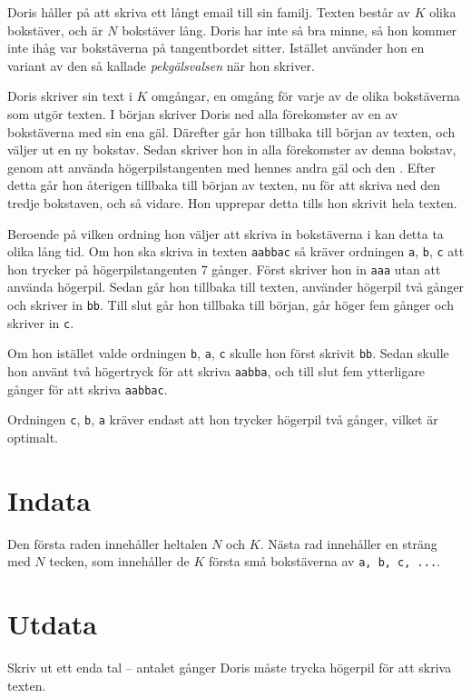 Doris håller på att skriva ett långt email till sin familj.
Texten består av $K$ olika bokstäver, och är $N$ bokstäver lång.
Doris har inte så bra minne, så hon kommer inte ihåg var bokstäverna på tangentbordet sitter.
Istället använder hon en variant av den så kallade \emph{pekgälsvalsen} när hon skriver.

Doris skriver sin text i $K$ omgångar, en omgång för varje av de olika bokstäverna som utgör texten.
I början skriver Doris ned alla förekomster av en av bokstäverna med sin ena gäl.
Därefter går hon tillbaka till början av texten, och väljer ut en ny bokstav.
Sedan skriver hon in alla förekomster av denna bokstav, genom att använda högerpilstangenten med hennes andra gäl och den .
Efter detta går hon återigen tillbaka till början av texten, nu för att skriva ned den tredje bokstaven, och så vidare.
Hon upprepar detta tills hon skrivit hela texten.

Beroende på vilken ordning hon väljer att skriva in bokstäverna i kan detta ta olika lång tid.
Om hon ska skriva in texten \texttt{aabbac} så kräver ordningen \texttt{a}, \texttt{b}, \texttt{c} att hon trycker på högerpilstangenten 7 gånger.
Först skriver hon in \texttt{aaa} utan att använda högerpil.
Sedan går hon tillbaka till texten, använder högerpil två gånger och skriver in \texttt{bb}.
Till slut går hon tillbaka till början, går höger fem gånger och skriver in \texttt{c}.

Om hon istället valde ordningen \texttt{b}, \texttt{a}, \texttt{c} skulle hon först skrivit \texttt{bb}.
Sedan skulle hon använt två högertryck för att skriva \texttt{aabba}, och till slut fem ytterligare gånger för att skriva \texttt{aabbac}.

Ordningen \texttt{c}, \texttt{b}, \texttt{a} kräver endast att hon trycker högerpil två gånger, vilket är optimalt.

\section*{Indata}
Den första raden innehåller heltalen $N$ och $K$.
Nästa rad innehåller en sträng med $N$ tecken, som innehåller de $K$ första små bokstäverna av \texttt{a, b, c, ...}.

\section*{Utdata}
Skriv ut ett enda tal -- antalet gånger Doris måste trycka högerpil för att skriva texten.

